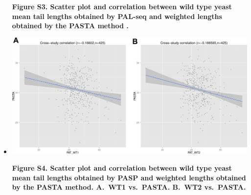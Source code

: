 \documentclass[10pt]{article}
\begin{document}
\begin{itemize}
{\textbf{Figure S3. Scatter plot and correlation between wild type yeast mean tail lengths obtained by PAL-seq \cite{subtelny14} and weighted lengths obtained by the PASTA method \cite{beilharz07}. }
}
\newpage

\item[]{
\begin{center}
\includegraphics[scale=0.9]{FigureS4.png}
\end{center}

\textbf{Figure S4. Scatter plot and correlation between wild type yeast mean tail lengths obtained by PASP and weighted lengths obtained by the PASTA method. \textbf{A.}~WT1 vs.\ PASTA. \textbf{B.}~WT2 vs.\ PASTA. }
}

\end{itemize}
\end{document}
